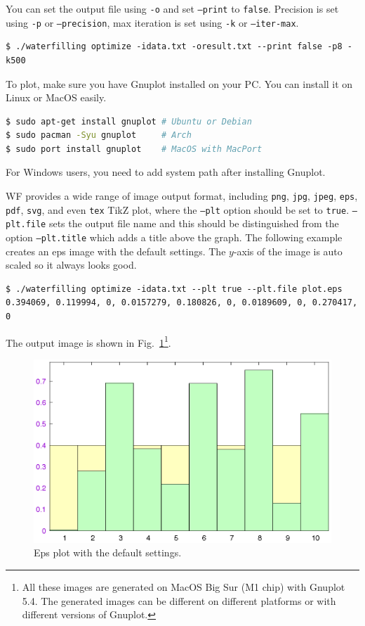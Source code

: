\documentclass[journal,twoside]{IEEEtran}
\begin{document}
    You can set the output file using \texttt{-o} and set \texttt{--print} to \texttt{false}.
    Precision is set using \texttt{-p} or \texttt{---precision}, max iteration is set using \texttt{-k} or \texttt{---iter-max}.

    \begin{lstlisting}[morekeywords={\$}]
$ ./waterfilling optimize -idata.txt -oresult.txt --print false -p8 -k500
    \end{lstlisting}

    To plot, make sure you have Gnuplot installed on your PC.
    You can install it on Linux or MacOS easily.
    \begin{lstlisting}[language=sh, morekeywords={\$}]
$ sudo apt-get install gnuplot # Ubuntu or Debian
$ sudo pacman -Syu gnuplot     # Arch
$ sudo port install gnuplot    # MacOS with MacPort
    \end{lstlisting}
    For Windows users, you need to add system path after installing Gnuplot.

    WF provides a wide range of image output format, including \texttt{png}, \texttt{jpg}, \texttt{jpeg}, \texttt{eps}, \texttt{pdf}, \texttt{svg}, and even \texttt{tex} TikZ plot, where the \texttt{---plt} option should be set to \texttt{true}. \texttt{---plt.file} sets the output file name and this should be distinguished from the option \texttt{---plt.title} which adds a title above the graph.
    The following example creates an eps image with the default settings.
    The $y$-axis of the image is auto scaled so it always looks good.
    \begin{lstlisting}[morekeywords={\$}]
$ ./waterfilling optimize -idata.txt --plt true --plt.file plot.eps
0.394069, 0.119994, 0, 0.0157279, 0.180826, 0, 0.0189609, 0, 0.270417, 0
    \end{lstlisting}
    The output image is shown in Fig.~\ref{fig:plot_10_eps}\footnote{All these images are generated on MacOS Big Sur (M1 chip) with Gnuplot 5.4. The generated images can be different on different platforms or with different versions of Gnuplot.}.
    \begin{figure}[htbp]
      \centering
      \includegraphics[width=\linewidth]{fig/plot_10.eps}
      \caption{Eps plot with the default settings.}
      \label{fig:plot_10_eps}
    \end{figure}
\end{document}
